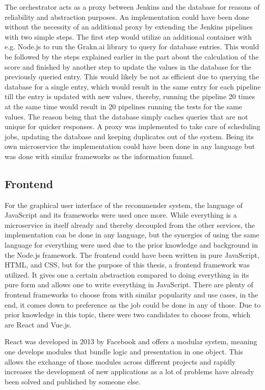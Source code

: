 The orchestrator acts as a proxy between Jenkins and the database for reasons of reliability and abstraction purposes.
An implementation could have been done without the necessity of an additional proxy by extending the Jenkins pipelines with two simple steps. The first step would utilize an additional container with e.g. Node.js to run the Grakn.ai library to query for database entries. This would be followed by the steps explained earlier in the part about the calculation of the score and finished by another step to update the values in the database for the previously queried entry. This would likely be not as efficient due to querying the database for a single entry, which would result in the same entry for each pipeline till the entry is updated with new values, thereby, running the pipeline 20 times at the same time would result in 20 pipelines running the tests for the same values. The reason being that the database simply caches queries that are not unique for quicker responses. A proxy was implemented to take care of scheduling jobs, updating the database and keeping duplicates out of the system. Being its own microservice the implementation could have been done in any language but was done with similar frameworks as the information funnel.
\subsection{Frontend}
\label{sec:fronted}
For the graphical user interface of the recommender system, the language of JavaScript and its frameworks were used once more. While everything is a microservice in itself already and thereby decoupled from the other services, the implementation can be done in any language, but the synergies of using the same language for everything were used due to the prior knowledge and background in the Node.js framework.
The frontend could have been written in pure JavaScript, HTML, and CSS, but for the purpose of this thesis, a frontend framework was utilized. It gives one a certain abstraction compared to doing everything in its pure form and allows one to write everything in JavaScript. There are plenty of frontend frameworks to choose from with similar popularity and use cases, in the end, it comes down to preference as the job could be done in any of those. Due to prior knowledge in this topic, there were two candidates to choose from, which are React and Vue.js.

React was developed in 2013 by Facebook \cite{react} and offers a modular system, meaning one develops modules that bundle logic and presentation in one object. This allows the exchange of those modules across different projects and rapidly increases the development of new applications as a lot of problems have already been solved and published by someone else.

